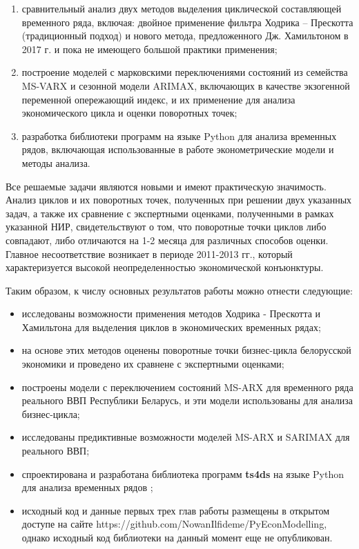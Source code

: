 \documentclass[a4paper,14pt]{extreport}
\begin{document}
{\begin{enumerate}
			\item   сравнительный анализ двух методов выделения циклической составляющей временного ряда, включая: двойное применение фильтра Ходрика – Прескотта (традиционный подход) и нового метода, предложенного Дж. Хамильтоном в 2017 г.  и пока не имеющего большой практики применения;
			\item   построение моделей с марковскими переключениями состояний из семейства MS-VARX и сезонной модели ARIMAX, включающих в качестве экзогенной переменной опережающий индекс, и их применение для анализа экономического цикла и оценки поворотных точек;
			\item   разработка библиотеки программ на языке Python для анализа временных рядов, включающая использованные в работе эконометрические модели и методы анализа.
		\end{enumerate}
		
		Все решаемые задачи являются новыми и имеют практическую значимость. Анализ циклов и их поворотных точек, полученных при решении двух указанных задач, а также их сравнение с экспертными оценками, полученными в рамках указанной НИР, свидетельствуют о том, что поворотные точки циклов либо совпадают, либо отличаются на 1-2 месяца для различных способов оценки. Главное несоответствие  возникает в периоде 2011-2013 гг., который характеризуется высокой неопределенностью экономической конъюнктуры.
		
		Таким образом, к числу основных результатов работы можно отнести следующие:
		
		\begin{itemize}
			\item исследованы возможности применения методов Ходрика - Прескотта и Хамильтона для выделения циклов в экономических временных рядах;
			\item на основе этих методов оценены поворотные точки бизнес-цикла белорусской экономики и проведено их сравнене с экспертными оценками;
			\item построены модели с переключением состояний MS-ARX для временного ряда реального ВВП Республики Беларусь, и эти модели использованы для анализа бизнес-цикла;
			\item исследованы предиктивные возможности моделей MS-ARX и SARIMAX для реального ВВП;
			\item спроектирована и разработана библиотека программ \textbf{ts4ds} на языке Python для анализа временных рядов ;
			\item исходный код и данные  первых трех глав работы размещены в открытом доступе на сайте {https://github.com/NowanIlfideme/PyEconModelling}, однако исходный код библиотеки на данный момент еще не опубликован.
		\end{itemize}
		
}
\end{document}
